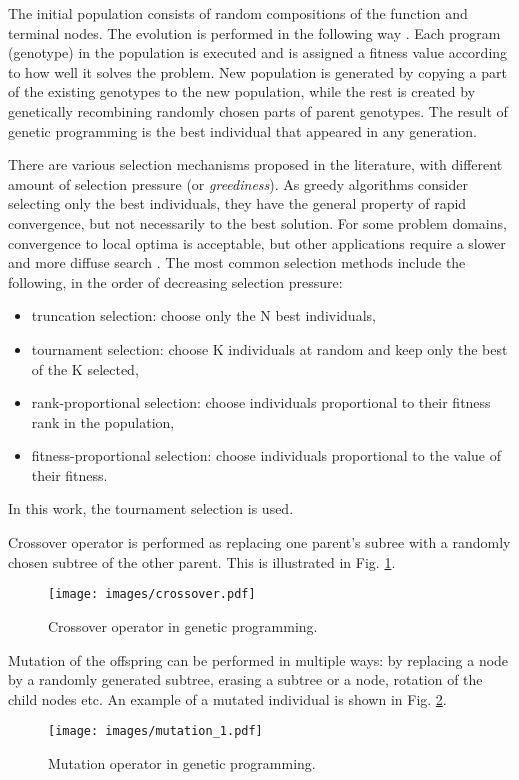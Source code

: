 The initial population consists of random compositions of the function and terminal nodes.
The evolution is performed in the following way \cite{koza1992genetic}.
Each program (genotype) in the population is executed and is assigned a fitness value according to how well it solves the problem.
New population is generated by copying a part of the existing genotypes to the new population, while the rest is created by genetically recombining randomly chosen parts of parent genotypes.
The result of genetic programming is the best individual that appeared in any generation.

There are various selection mechanisms proposed in the literature, with different amount of selection pressure (or \textit{greediness}).
As greedy algorithms consider selecting only the best individuals, they have the general property of rapid convergence, but not necessarily to the best solution.
For some problem domains, convergence to local optima is acceptable, but other applications require a slower and more diffuse search \cite{rozenberg2012handbook}.
The most common selection methods include the following, in the order of decreasing selection pressure:
\begin{itemize}
	\item truncation selection: choose only the N best individuals,
	\item tournament selection: choose K individuals at random and keep only the best of the K selected,
	\item rank-proportional selection: choose individuals proportional to their fitness rank in the population,
	\item fitness-proportional selection: choose individuals proportional to the value of their fitness.
\end{itemize}
In this work, the tournament selection is used.

Crossover operator is performed as replacing one parent's subree with a randomly chosen subtree of the other parent.
This is illustrated in Fig. \ref{genprog:ex2}.
\begin{figure}[ht]
    \centering
    \texttt{[image: images/crossover.pdf]}
    \caption{Crossover operator in genetic programming.}
    \label{genprog:ex2}
\end{figure}

Mutation of the offspring can be performed in multiple ways: by replacing a node by a randomly generated subtree, erasing a subtree or a node, rotation of the child nodes etc.
An example of a mutated individual is shown in Fig. \ref{genprog:ex3}.
\begin{figure}[H]
    \centering
    \texttt{[image: images/mutation\_1.pdf]}
    \caption{Mutation operator in genetic programming.}
    \label{genprog:ex3}
\end{figure}

